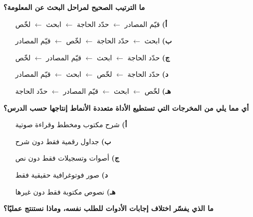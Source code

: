 \documentclass[11pt,a4paper]{article}
\begin{document}
\begin{multicols}{2}
\begin{minipage}{\linewidth}
\begin{itemize}[leftmargin=0.95cm, labelsep=4pt, itemsep=0pt, topsep=2pt, parsep=0pt]
\end{itemize}
\end{minipage}\par\vspace{7pt plus 4pt}
\noindent\begin{minipage}{\linewidth}
\hangindent=0.7cm\textbf{ما الترتيب الصحيح لمراحل البحث عن المعلومة؟}
\begin{itemize}[leftmargin=0.95cm, labelsep=4pt, itemsep=0pt, topsep=2pt, parsep=0pt]
  \item[\textbf{أ)}] قيّم المصادر $\leftarrow$ حدّد الحاجة $\leftarrow$ ابحث $\leftarrow$ لخّص
  \item[\textbf{ب)}] ابحث $\leftarrow$ حدّد الحاجة $\leftarrow$ لخّص $\leftarrow$ قيّم المصادر
  \item[\textbf{ج)}] حدّد الحاجة $\leftarrow$ ابحث $\leftarrow$ قيّم المصادر $\leftarrow$ لخّص
  \item[\textbf{د)}] حدّد الحاجة $\leftarrow$ لخّص $\leftarrow$ ابحث $\leftarrow$ قيّم المصادر
  \item[\textbf{هـ)}] لخّص $\leftarrow$ ابحث $\leftarrow$ قيّم المصادر $\leftarrow$ حدّد الحاجة
\end{itemize}
\end{minipage}\par\vspace{7pt plus 4pt}
\noindent\begin{minipage}{\linewidth}
\hangindent=0.7cm\textbf{أي مما يلي من المخرجات التي تستطيع الأداة متعددة الأنماط إنتاجها حسب الدرس؟}
\begin{itemize}[leftmargin=0.95cm, labelsep=4pt, itemsep=0pt, topsep=2pt, parsep=0pt]
  \item[\textbf{أ)}] شرح مكتوب ومخطط وقراءة صوتية
  \item[\textbf{ب)}] جداول رقمية فقط دون شرح
  \item[\textbf{ج)}] أصوات وتسجيلات فقط دون نص
  \item[\textbf{د)}] صور فوتوغرافية حقيقية فقط
  \item[\textbf{هـ)}] نصوص مكتوبة فقط دون غيرها
\end{itemize}
\end{minipage}\par\vspace{7pt plus 4pt}
\noindent\begin{minipage}{\linewidth}
\hangindent=0.7cm\textbf{ما الذي يفسّر اختلاف إجابات الأدوات للطلب نفسه، وماذا نستنتج عمليًا؟}

\end{minipage}
\end{multicols}
\end{document}
